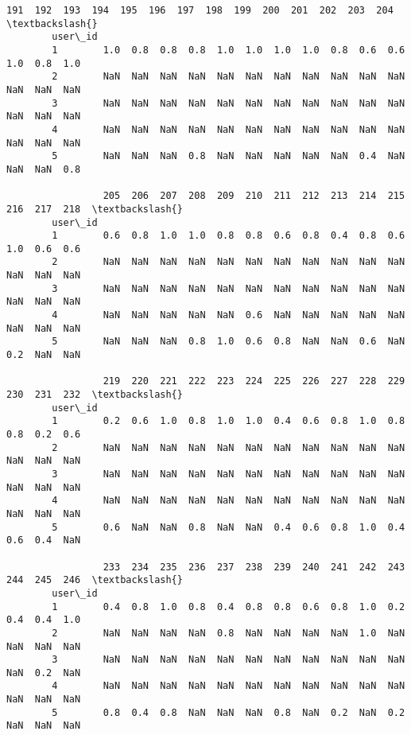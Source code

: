 \documentclass[11pt]{article}
\begin{document}
\begin{Verbatim}[commandchars=\\\{\}]
                 191  192  193  194  195  196  197  198  199  200  201  202  203  204  \textbackslash{}
        user\_id                                                                         
        1        1.0  0.8  0.8  0.8  1.0  1.0  1.0  1.0  0.8  0.6  0.6  1.0  0.8  1.0   
        2        NaN  NaN  NaN  NaN  NaN  NaN  NaN  NaN  NaN  NaN  NaN  NaN  NaN  NaN   
        3        NaN  NaN  NaN  NaN  NaN  NaN  NaN  NaN  NaN  NaN  NaN  NaN  NaN  NaN   
        4        NaN  NaN  NaN  NaN  NaN  NaN  NaN  NaN  NaN  NaN  NaN  NaN  NaN  NaN   
        5        NaN  NaN  NaN  0.8  NaN  NaN  NaN  NaN  NaN  0.4  NaN  NaN  NaN  0.8   
        
                 205  206  207  208  209  210  211  212  213  214  215  216  217  218  \textbackslash{}
        user\_id                                                                         
        1        0.6  0.8  1.0  1.0  0.8  0.8  0.6  0.8  0.4  0.8  0.6  1.0  0.6  0.6   
        2        NaN  NaN  NaN  NaN  NaN  NaN  NaN  NaN  NaN  NaN  NaN  NaN  NaN  NaN   
        3        NaN  NaN  NaN  NaN  NaN  NaN  NaN  NaN  NaN  NaN  NaN  NaN  NaN  NaN   
        4        NaN  NaN  NaN  NaN  NaN  0.6  NaN  NaN  NaN  NaN  NaN  NaN  NaN  NaN   
        5        NaN  NaN  NaN  0.8  1.0  0.6  0.8  NaN  NaN  0.6  NaN  0.2  NaN  NaN   
        
                 219  220  221  222  223  224  225  226  227  228  229  230  231  232  \textbackslash{}
        user\_id                                                                         
        1        0.2  0.6  1.0  0.8  1.0  1.0  0.4  0.6  0.8  1.0  0.8  0.8  0.2  0.6   
        2        NaN  NaN  NaN  NaN  NaN  NaN  NaN  NaN  NaN  NaN  NaN  NaN  NaN  NaN   
        3        NaN  NaN  NaN  NaN  NaN  NaN  NaN  NaN  NaN  NaN  NaN  NaN  NaN  NaN   
        4        NaN  NaN  NaN  NaN  NaN  NaN  NaN  NaN  NaN  NaN  NaN  NaN  NaN  NaN   
        5        0.6  NaN  NaN  0.8  NaN  NaN  0.4  0.6  0.8  1.0  0.4  0.6  0.4  NaN   
        
                 233  234  235  236  237  238  239  240  241  242  243  244  245  246  \textbackslash{}
        user\_id                                                                         
        1        0.4  0.8  1.0  0.8  0.4  0.8  0.8  0.6  0.8  1.0  0.2  0.4  0.4  1.0   
        2        NaN  NaN  NaN  NaN  0.8  NaN  NaN  NaN  NaN  1.0  NaN  NaN  NaN  NaN   
        3        NaN  NaN  NaN  NaN  NaN  NaN  NaN  NaN  NaN  NaN  NaN  NaN  0.2  NaN   
        4        NaN  NaN  NaN  NaN  NaN  NaN  NaN  NaN  NaN  NaN  NaN  NaN  NaN  NaN   
        5        0.8  0.4  0.8  NaN  NaN  NaN  0.8  NaN  0.2  NaN  0.2  NaN  NaN  NaN   
        

\end{Verbatim}
\end{document}
